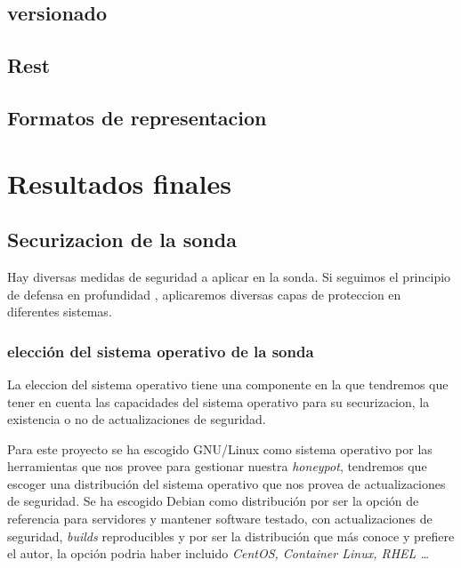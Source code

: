 


\subsection{versionado}


\subsection{Rest}

\subsection{Formatos de representacion}



\section{Resultados finales}



\subsection{Securizacion de la sonda}

Hay diversas medidas de seguridad a aplicar en la sonda. Si seguimos el principio de defensa en profundidad \cite{wikipedia-defense-in-depth}, aplicaremos diversas capas de proteccion en diferentes sistemas.

\subsubsection{elección del sistema operativo de la sonda}

La eleccion del sistema operativo tiene una componente en la que tendremos que tener en cuenta las capacidades del sistema operativo para su securizacion,
la existencia o no de actualizaciones de seguridad.

Para este proyecto se ha escogido GNU/Linux como sistema operativo por las herramientas que nos provee para gestionar nuestra \emph{honeypot}, 
tendremos que escoger una distribución del sistema operativo que nos provea de actualizaciones de seguridad. 
Se ha escogido Debian como distribución por ser la opción de referencia para servidores y mantener software testado, con actualizaciones de seguridad, \emph{builds} reproducibles y por ser la distribución que más conoce y prefiere el autor, la opción podria haber incluido \emph{CentOS, Container Linux, RHEL \ldots} 

